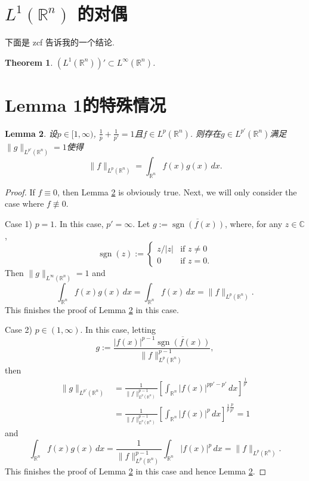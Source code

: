 \documentclass[a4paper,11pt]{article}
\newtheorem{theorem}{Theorem}[section]
\newtheorem{lemma}[theorem]{Lemma}
\theoremstyle{definition}
\begin{document}
\section{$ L^1(\mathbb{R}^n)$ 的对偶}

下面是 zcf 告诉我的一个结论.

\begin{theorem}
$ (L^1(\mathbb{R}^n))' \subset L^\infty(\mathbb{R}^n) $.
\end{theorem}

\newpage

\section{Lemma 1的特殊情况}

\begin{lemma}\label{spe}
设$ p \in [1, \infty) $, $\frac1p+\frac1{p'}=1$且$ f\in L^p(\mathbb{R}^n)$.
则存在$g\in L^{p'}(\mathbb{R}^n)$满足$\|g\|_{L^{p'}(\mathbb{R}^n)}=1$使得
$$
\| f \|_{L^p(\mathbb{R}^n)}
= \int_{\mathbb{R}^n} f(x) g(x) \, dx.
$$
\end{lemma}

\begin{proof}
If $f\equiv0$, then Lemma \ref{spe} is obviously true.
Next, we will only consider the case where $f\not\equiv0$.

Case 1) $p=1$. In this case, $p'=\infty$.
Let $g:=\overline{\operatorname{sgn}(f(x))}$,
where, for any $z\in\mathbb C$,
$$
\operatorname{sgn}(z)
:=\begin{cases}
z/|z|&\text{if } z\neq0\\
0&\text{if } z=0.
\end{cases}
$$
Then $\|g\|_{L^\infty(\mathbb{R}^n)}=1$ and
$$
\int_{\mathbb{R}^n} f(x) g(x) \, dx
=\int_{\mathbb{R}^n} f(x) \, dx
=\| f \|_{L^p(\mathbb{R}^n)}.
$$
This finishes the proof of Lemma \ref{spe} in this case.

Case 2) $p\in(1,\infty)$. In this case, letting
$$
g:=\frac{|f(x)|^{p-1}\overline{\operatorname{sgn}(f(x))}}
{\|f\|_{L^p(\mathbb{R}^n)}^{p-1}},
$$
then
\begin{align*}
\|g\|_{L^{p'}(\mathbb{R}^n)}
&=\frac1{\|f\|_{L^p(\mathbb{R}^n)}^{p-1}}
\left[\int_{\mathbb R^n}|f(x)|^{pp'-p'}\,dx\right]^{\frac1{p'}}\\
&=\frac1{\|f\|_{L^p(\mathbb{R}^n)}^{p-1}}
\left[\int_{\mathbb R^n}|f(x)|^p\,dx\right]^{\frac{1}{p}\frac{p}{p'}}
=1
\end{align*}
and
$$
\int_{\mathbb{R}^n} f(x) g(x) \, dx
=\frac1{\|f\|_{L^p(\mathbb{R}^n)}^{p-1}}
\int_{\mathbb{R}^n} |f(x)|^p \, dx
=\| f \|_{L^p(\mathbb{R}^n)}.
$$
This finishes the proof of Lemma \ref{spe} in this case and hence Lemma \ref{spe}.
\end{proof}
\end{document}

